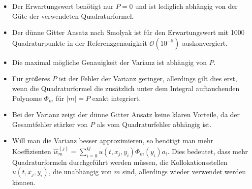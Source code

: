 \begin{itemize}
\item Der Erwartungswert benötigt nur $P=0$ und ist lediglich abhängig von der Güte der verwendeten Quadraturformel.
\item Der dünne Gitter Ansatz nach Smolyak ist für den Erwartungswert mit 1000 Quadraturpunkte in der Referenzgenauigkeit $\mathcal{O}(10^{-5})$ auskonvergiert.
\item Die maximal mögliche Genauigkeit der Varianz ist abhängig von $P$. 
\item Für größeres $P$ ist der Fehler der Varianz geringer, allerdings gilt dies erst, wenn die Quadraturformel die zusätzlich unter dem Integral auftauchenden Polynome $\Phi_m$ für $|m|=P$ exakt integriert.
\item Bei der Varianz zeigt der dünne Gitter Ansatz keine klaren Vorteile, da der Gesamtfehler stärker von $P$ als vom Quadraturfehler abhängig ist.
\item Will man die Varianz besser approximieren, so benötigt man mehr Koeffizienten $\hat{w}_m^{(j)}=\sum_{i=0}^Qu(t,x_j,y_i)\Phi_m(y_i)a_i$. Dies bedeutet, dass mehr Quadraturformeln durchgeführt werden müssen, die Kollokationsstellen $u(t,x_j,y_i)$, die unabhängig von $m$ sind, allerdings wieder verwendet werden können.
\end{itemize} 

